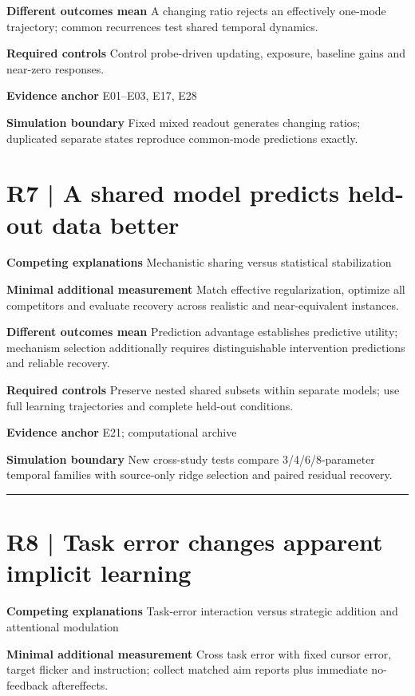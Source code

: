 \documentclass[11pt,a4paper]{article}
\begin{document}
\medskip\textbf{Different outcomes mean} A changing ratio rejects an effectively one-mode trajectory; common recurrences test shared temporal dynamics.\par
\medskip\textbf{Required controls} Control probe-driven updating, exposure, baseline gains and near-zero responses.\par
\medskip\textbf{Evidence anchor} E01--E03, E17, E28\par
\medskip\textbf{Simulation boundary} Fixed mixed readout generates changing ratios; duplicated separate states reproduce common-mode predictions exactly.\par
\clearpage\section{R7 | A shared model predicts held-out data better}
\medskip\textbf{Competing explanations} Mechanistic sharing versus statistical stabilization\par
\medskip\textbf{Minimal additional measurement} Match effective regularization, optimize all competitors and evaluate recovery across realistic and near-equivalent instances.\par
\medskip\textbf{Different outcomes mean} Prediction advantage establishes predictive utility; mechanism selection additionally requires distinguishable intervention predictions and reliable recovery.\par
\medskip\textbf{Required controls} Preserve nested shared subsets within separate models; use full learning trajectories and complete held-out conditions.\par
\medskip\textbf{Evidence anchor} E21; computational archive\par
\medskip\textbf{Simulation boundary} New cross-study tests compare 3/4/6/8-parameter temporal families with source-only ridge selection and paired residual recovery.\par
\bigskip\hrule\medskip\section{R8 | Task error changes apparent implicit learning}
\medskip\textbf{Competing explanations} Task-error interaction versus strategic addition and attentional modulation\par
\medskip\textbf{Minimal additional measurement} Cross task error with fixed cursor error, target flicker and instruction; collect matched aim reports plus immediate no-feedback aftereffects.\par
\end{document}
